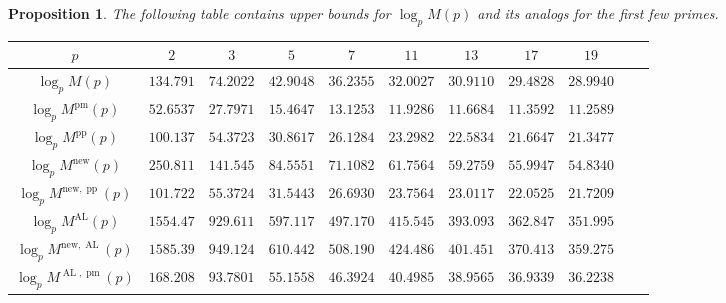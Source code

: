 \documentclass[11pt,letterpaper,reqno]{amsart}
\newtheorem{proposition}[theorem]{Proposition}
\theoremstyle{definition}
\numberwithin{equation}{section}
\numberwithin{figure}{section}
\numberwithin{table}{section}
\newcommand{\nw}{\mathrm{new}}
\begin{document}
\begin{proposition} \label{prop:upper-bounds-on-E(p)}
    The following table contains upper bounds for $\log_p M(p)$ and its analogs for the first few primes.

    \begin{center}
    \begin{tabular}{|c||c|c|c|c|c|c|c|c|c|c|}
    \hline
       $p$ & $2$ & $3$ & $5$ & $7$ & $11$ & $13$ & $17$ & $19$ \\
    \hline
    \hline
       $\log_p M(p)$ & $134.791$ & $74.2022$ & $42.9048$ & $36.2355$ & $32.0027$ & $30.9110$ & $29.4828$ & $28.9940$  \\
    \hline
        $\log_p M^{\operatorname{pm}}(p)$ & $52.6537$ & $27.7971$ & $15.4647$ & $13.1253$ & $11.9286$ & $11.6684$ & $11.3592$ & $11.2589$  \\
    \hline
        $\log_p M^{\operatorname{pp}}(p)$ & $100.137$ & $54.3723$ & $30.8617$ & $26.1284$ & $23.2982$ & $22.5834$ & $21.6647$ & $21.3477$  \\
    \hline
    \hline
        $\log_p M^\nw(p)$ & $250.811$ & $141.545$ & $84.5551$ & $71.1082$ & $61.7564$ & $59.2759$ & $55.9947$ & $54.8340$  \\
    \hline
        $\log_p M^{\nw, \operatorname{pp}}(p)$ & $101.722$ & $55.3724$ & $31.5443$ & $26.6930$ & $23.7564$ & $23.0117$ & $22.0525$ & $21.7209$  \\
    \hline
    \hline
    $\log_p M^{\operatorname{AL}}(p)$ & $1554.47$ & $929.611$ & $597.117$ & $497.170$ & $415.545$ & $393.093$ & $362.847$ & $351.995$  \\
    \hline
    $\log_p M^{\nw, \operatorname{AL}}(p)$ & $1585.39$ & $949.124$ & $610.442$ & $508.190$ & $424.486$ & $401.451$ & $370.413$ & $359.275$  \\
    \hline
    $\log_p M^{\operatorname{AL}, \operatorname{pm}}(p)$ & $168.208$ & $93.7801$ & $55.1558$ & $46.3924$ & $40.4985$ & $38.9565$ & $36.9339$ & $36.2238$  \\
    \hline
    \end{tabular}
\end{center}
\end{proposition}
\end{document}
